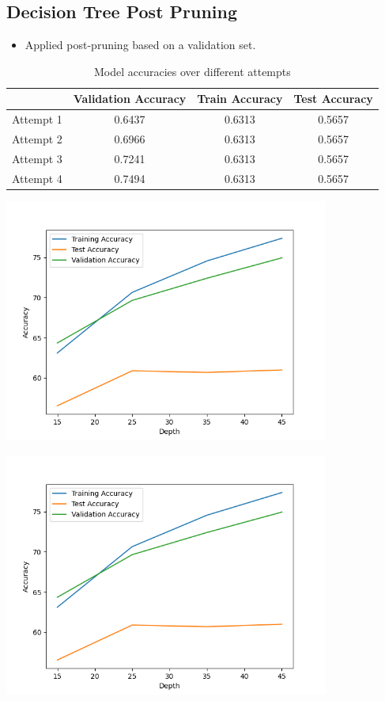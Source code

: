 \documentclass[12pt]{article}
\begin{document}
\subsection{Decision Tree Post Pruning}
    \begin{itemize}
        \item Applied post-pruning based on a validation set.
    \end{itemize}

    \begin{table}[ht]
\centering
\begin{tabular}{@{}lccc@{}}
\toprule
 & Validation Accuracy & Train Accuracy & Test Accuracy \\ 
\midrule
Attempt 1 & 0.6437 & 0.6313 & 0.5657 \\
Attempt 2 & 0.6966 & 0.6313 & 0.5657 \\
Attempt 3 & 0.7241 & 0.6313 & 0.5657 \\
Attempt 4 & 0.7494 & 0.6313 & 0.5657 \\
\bottomrule
\end{tabular}
\caption{Model accuracies over different attempts}
\label{tab:accuracies}
\end{table}

\begin{center}
    \includegraphics[width=0.8\textwidth]{Assignment 3/q1/(c)depth_vs_accuracy after pruning.png}
\end{center}

\begin{center}
    \includegraphics[width=0.8\textwidth]{Assignment 3/q1/(c)depth_vs_accuracy after pruning.png}
\end{center}
\end{document}
